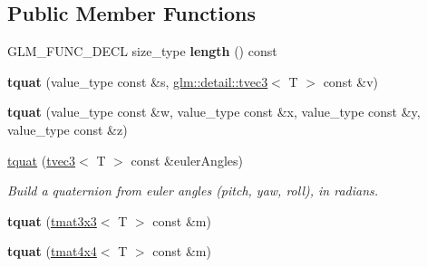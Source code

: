 \subsection*{Public Member Functions}
\begin{DoxyCompactItemize}
\item 
\hypertarget{structglm_1_1detail_1_1tquat_a1611e6cc2bc5e0d08604d6a0c14a5ccc}{G\-L\-M\-\_\-\-F\-U\-N\-C\-\_\-\-D\-E\-C\-L size\-\_\-type {\bfseries length} () const }\label{structglm_1_1detail_1_1tquat_a1611e6cc2bc5e0d08604d6a0c14a5ccc}

\item 
\hypertarget{structglm_1_1detail_1_1tquat_ad7d9f5911f3b5753d6dfdb7ccd25fbb8}{{\bfseries tquat} (value\-\_\-type const \&s, \hyperlink{structglm_1_1detail_1_1tvec3}{glm\-::detail\-::tvec3}$<$ T $>$ const \&v)}\label{structglm_1_1detail_1_1tquat_ad7d9f5911f3b5753d6dfdb7ccd25fbb8}

\item 
\hypertarget{structglm_1_1detail_1_1tquat_acef752b329f028e2f1c3e9f1e35809d5}{{\bfseries tquat} (value\-\_\-type const \&w, value\-\_\-type const \&x, value\-\_\-type const \&y, value\-\_\-type const \&z)}\label{structglm_1_1detail_1_1tquat_acef752b329f028e2f1c3e9f1e35809d5}

\item 
\hypertarget{structglm_1_1detail_1_1tquat_a2ee7f0a62a6de508aeb2b2bc1b7f4023}{\hyperlink{structglm_1_1detail_1_1tquat_a2ee7f0a62a6de508aeb2b2bc1b7f4023}{tquat} (\hyperlink{structglm_1_1detail_1_1tvec3}{tvec3}$<$ T $>$ const \&euler\-Angles)}\label{structglm_1_1detail_1_1tquat_a2ee7f0a62a6de508aeb2b2bc1b7f4023}

\begin{DoxyCompactList}\small\item\em Build a quaternion from euler angles (pitch, yaw, roll), in radians. \end{DoxyCompactList}\item 
\hypertarget{structglm_1_1detail_1_1tquat_ac0fcf8983500fac2a2f5862eb511ddb9}{{\bfseries tquat} (\hyperlink{structglm_1_1detail_1_1tmat3x3}{tmat3x3}$<$ T $>$ const \&m)}\label{structglm_1_1detail_1_1tquat_ac0fcf8983500fac2a2f5862eb511ddb9}

\item 
\hypertarget{structglm_1_1detail_1_1tquat_aad341bf8700b9abee6daff3deda4c954}{{\bfseries tquat} (\hyperlink{structglm_1_1detail_1_1tmat4x4}{tmat4x4}$<$ T $>$ const \&m)}\label{structglm_1_1detail_1_1tquat_aad341bf8700b9abee6daff3deda4c954}


\end{DoxyCompactItemize}
